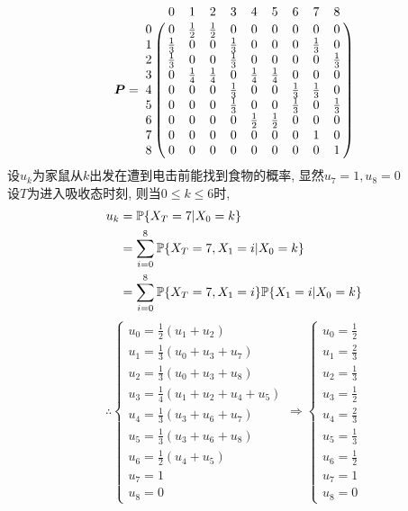 \begin{solution}
	\[
		\bm{P} =
		\bordermatrix{
			~ & 0 & 1 & 2 & 3 & 4 & 5 & 6 & 7 & 8 \cr
			0 & 0 & \frac{1}{2} & \frac{1}{2} & 0 & 0 & 0 & 0 & 0 & 0 \cr
			1 & \frac{1}{3} & 0 & 0 & \frac{1}{3} & 0 & 0 & 0 & \frac{1}{3} & 0 \cr
			2 & \frac{1}{3} & 0 & 0 & \frac{1}{3} & 0 & 0 & 0 & 0 & \frac{1}{3}\cr
			3 & 0 & \frac{1}{4} & \frac{1}{4} & 0 & \frac{1}{4} & \frac{1}{4} & 0 & 0 & 0 \cr
			4 & 0 & 0 & 0 & \frac{1}{3} & 0 & 0 &\frac{1}{3} & \frac{1}{3} & 0 \cr
			5 & 0 & 0 & 0 & \frac{1}{3} & 0 & 0 &\frac{1}{3} & 0 & \frac{1}{3} \cr
			6 & 0 & 0 & 0 & 0 & \frac{1}{2} & \frac{1}{2} & 0 & 0 & 0 \cr
			7 & 0 & 0 & 0 & 0 & 0 & 0 & 0 & 1 & 0 \cr
			8 & 0 & 0 & 0 & 0 & 0 & 0 & 0 & 0 & 1 \cr}
	\]
	设$u_k$为家鼠从$k$出发在遭到电击前能找到食物的概率, 显然$u_7 = 1, u_8 = 0$\\
	设$T$为进入吸收态时刻, 则当$0 \leqslant k \leqslant 6$时,
	\begin{align*}
		u_k & = \mathbb{P}\{X_T = 7 | X_0 = k\}                                    \\
		    & = \sum^8_{i=0}\mathbb{P}\{X_T = 7, X_1 = i | X_0 = k\}               \\
		    & = \sum^8_{i=0}\mathbb{P}\{X_T = 7, X_1 = i\} \mathbb{P}\{X_1 = i | X_0 = k\}
	\end{align*}
	\[\therefore
		\begin{cases}
			u_0 = \frac{1}{2}(u_1+u_2)         \\
			u_1 = \frac{1}{3}(u_0+u_3+u_7)     \\
			u_2 = \frac{1}{3}(u_0+u_3+u_8)     \\
			u_3 = \frac{1}{4}(u_1+u_2+u_4+u_5) \\
			u_4 = \frac{1}{3}(u_3+u_6+u_7)     \\
			u_5 = \frac{1}{3}(u_3+u_6+u_8)     \\
			u_6 = \frac{1}{2}(u_4+u_5)         \\
			u_7 = 1                            \\
			u_8 = 0
		\end{cases}\Rightarrow
		\begin{cases}
			u_0 = \frac{1}{2} \\
			u_1 = \frac{2}{3} \\
			u_2 = \frac{1}{3} \\
			u_3 = \frac{1}{2} \\
			u_4 = \frac{2}{3} \\
			u_5 = \frac{1}{3} \\
			u_6 = \frac{1}{2} \\
			u_7 = 1           \\
			u_8 = 0
		\end{cases}
	\]
\end{solution}

